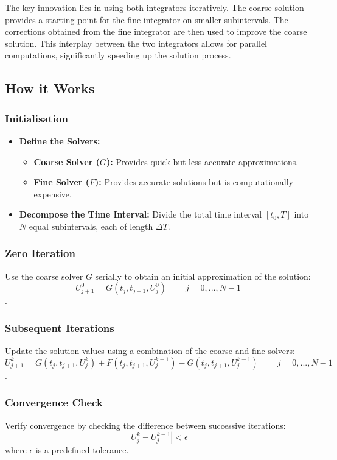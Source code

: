 \documentclass[a4paper,12pt,french]{article}
\begin{document}
The key innovation lies in using both integrators iteratively. The coarse solution provides a starting point for the fine integrator on smaller subintervals. The corrections obtained from the fine integrator are then used to improve the coarse solution. This interplay between the two integrators allows for parallel computations, significantly speeding up the solution process.

\subsection{How it Works}
\subsubsection*{Initialisation}
\begin{itemize}
    \item {\textbf{Define the Solvers:}
            \begin{itemize}
                \item \textbf{Coarse Solver ($G$):} Provides quick but less accurate approximations.
                    
                \item \textbf{Fine Solver ($F$):} Provides accurate solutions but is computationally expensive.
            \end{itemize}}

    \item \textbf{Decompose the Time Interval:} Divide the total time interval $[t_0,T]$ into $N$ equal subintervals, each of length $\Delta T$. 
\end{itemize}

\subsubsection*{Zero Iteration}
   Use the coarse solver $G$ serially to obtain an initial approximation of the solution:
    $$ U_{j+1}^0 = G(t_j,t_{j+1}, U_j^0)   \;\;\;\;\;\;\;\; j = 0, ..., N-1$$.
\subsubsection*{Subsequent Iterations} 
Update the solution values using a combination of the coarse and fine solvers:
    $$ U_{j+1}^k = G(t_j,t_{j+1},U_j^k) + F(t_j,t_{j+1},U_j^{k-1}) -G(t_j,t_{j+1},U_j^{k-1}) \;\;\;\;\;\;\;\; j = 0, ... ,N-1$$.
\subsubsection*{Convergence Check}
        Verify convergence by checking the difference between successive iterations:
      $$   | U_j^k - U_j^{k-1} | < \epsilon $$
   where $ \epsilon $ is a predefined tolerance. 
\end{document}
